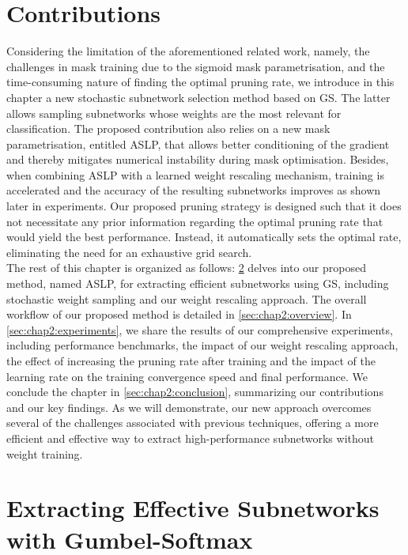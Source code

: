\section{Contributions}
\label{sec:chap2:intro_contributions}

Considering the limitation of the aforementioned related work, namely, the
challenges in mask training due to the sigmoid mask parametrisation, and the
time-consuming nature of finding the optimal pruning rate, we introduce in this
chapter a new stochastic subnetwork selection method based on \ac{GS}. The
latter allows sampling subnetworks whose weights are the most relevant for
classification. The proposed contribution also relies on a new mask
parametrisation, entitled \acf{ASLP}, that allows better conditioning of the
gradient and thereby mitigates numerical instability during mask optimisation.
Besides, when combining \ac{ASLP} with a learned weight rescaling mechanism,
training is accelerated and the accuracy of the resulting subnetworks improves
as shown later in experiments. Our proposed pruning strategy is designed such
that it does not necessitate any prior information regarding the optimal pruning
rate that would yield the best performance. Instead, it automatically sets the
optimal rate, eliminating the need for an exhaustive grid search.\\ 

The rest of this chapter is organized as follows: \cref{sec:chap2:method} delves
into our proposed method, named \acf{ASLP}, for extracting efficient subnetworks
using \acl{GS}, including stochastic weight sampling and our weight rescaling
approach. The overall workflow of our proposed method is detailed in
\cref{sec:chap2:overview}. In \cref{sec:chap2:experiments}, we share the results
of our comprehensive experiments, including performance benchmarks, the impact
of our weight rescaling approach, the effect of increasing the pruning rate
after training and the impact of the learning rate on the training convergence
speed and final performance. We conclude the chapter in
\cref{sec:chap2:conclusion}, summarizing our contributions and our key findings.
As we will demonstrate, our new approach overcomes several of the challenges
associated with previous techniques, offering a more efficient and effective way
to extract high-performance subnetworks without weight training.


\section{Extracting Effective Subnetworks with Gumbel-Softmax}\label{sec:chap2:method}

